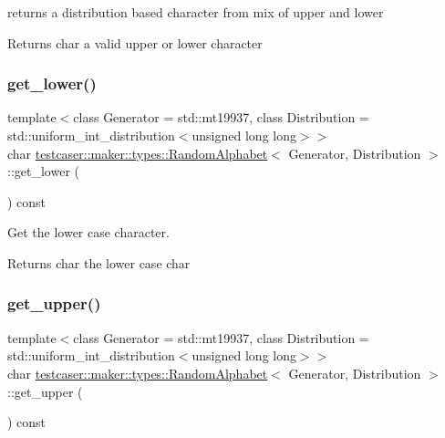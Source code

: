 returns a distribution based character from mix of upper and lower 

\begin{DoxyReturn}{Returns}
char a valid upper or lower character 
\end{DoxyReturn}
\mbox{\label{classtestcaser_1_1maker_1_1types_1_1RandomAlphabet_a6fccb771852c1f44ed268a9867589026}} 
\subsubsection{\texorpdfstring{get\+\_\+lower()}{get\_lower()}}
{\footnotesize\ttfamily template$<$class Generator = std\+::mt19937, class Distribution = std\+::uniform\+\_\+int\+\_\+distribution$<$unsigned long long$>$$>$ \\
char \hyperlink{classtestcaser_1_1maker_1_1types_1_1RandomAlphabet}{testcaser\+::maker\+::types\+::\+Random\+Alphabet}$<$ Generator, Distribution $>$\+::get\+\_\+lower (\begin{DoxyParamCaption}{ }\end{DoxyParamCaption}) const\hspace{0.3cm}{\ttfamily [inline]}}



Get the lower case character. 

\begin{DoxyReturn}{Returns}
char the lower case char 
\end{DoxyReturn}
\mbox{\label{classtestcaser_1_1maker_1_1types_1_1RandomAlphabet_a398a597e207dea4a284537feb8fc6086}} 
\subsubsection{\texorpdfstring{get\+\_\+upper()}{get\_upper()}}
{\footnotesize\ttfamily template$<$class Generator = std\+::mt19937, class Distribution = std\+::uniform\+\_\+int\+\_\+distribution$<$unsigned long long$>$$>$ \\
char \hyperlink{classtestcaser_1_1maker_1_1types_1_1RandomAlphabet}{testcaser\+::maker\+::types\+::\+Random\+Alphabet}$<$ Generator, Distribution $>$\+::get\+\_\+upper (\begin{DoxyParamCaption}{ }\end{DoxyParamCaption}) const\hspace{0.3cm}{\ttfamily [inline]}}



